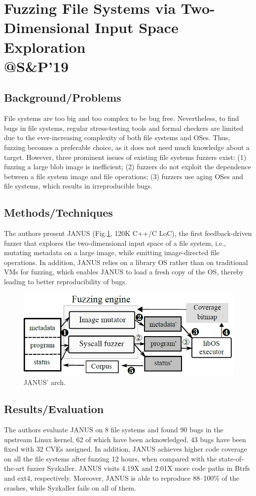 \section{Fuzzing File Systems via Two-Dimensional Input Space Exploration \\@S\&P'19}
\subsection{Background/Problems}
File systems are too big and too complex to be bug free. Nevertheless, to find bugs in file systems, regular stress-testing tools and formal checkers are limited due to the ever-increasing complexity of both file systems and OSes. Thus, fuzzing becomes a preferable choice, as it does not need much knowledge about a target. However, three prominent issues of existing file systems fuzzers exist: (1) fuzzing a large blob image is inefficient; (2) fuzzers do not exploit the dependence between a file system image and file operations; (3) fuzzers use aging OSes and file systems, which results in irreproducible bugs.

\subsection{Methods/Techniques}
The authors present JANUS (Fig.\ref{fig:janus}, 120K C++/C LoC), the first feedback-driven fuzzer that explores the two-dimensional input space of a file system, i.e., mutating metadata on a large image, while emitting image-directed file operations. In addition, JANUS relies on a library OS rather than on traditional VMs for fuzzing, which enables JANUS to load a fresh copy of the OS, thereby leading to better reproducibility of bugs.
\begin{figure}[h]
    \centering
    \includegraphics[scale=0.5]{janus.png} %
    \caption{JANUS' arch.}	
    \label{fig:janus}
\end{figure}
\subsection{Results/Evaluation}
The authors evaluate JANUS on 8 file systems and found 90 bugs in the upstream Linux kernel, 62 of which have been acknowledged. 43 bugs have been fixed with 32 CVEs assigned. In addition, JANUS achieves higher code coverage on all the file systems after fuzzing 12 hours, when compared with the state-of-the-art fuzzer Syzkaller.  JANUS visits 4.19X and 2.01X more code paths in Btrfs and ext4, respectively. Moreover, JANUS is able to reproduce 88–100\% of the crashes, while Syzkaller fails on all of them.
